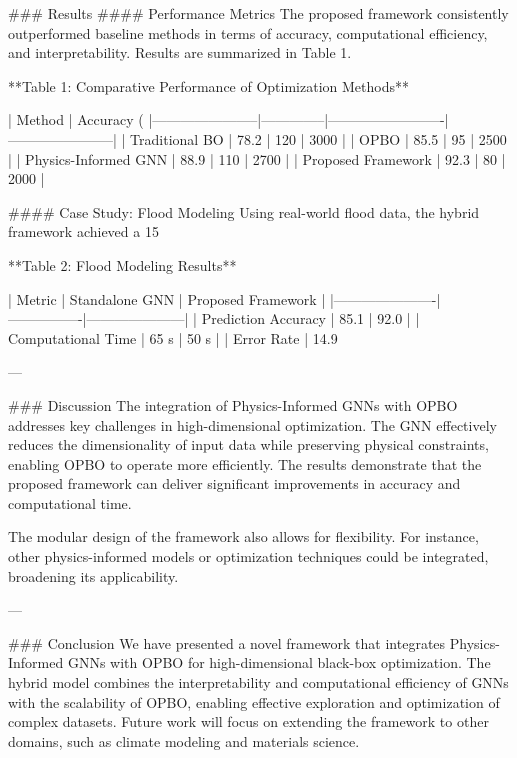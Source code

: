 ### Results  
#### Performance Metrics  
The proposed framework consistently outperformed baseline methods in terms of accuracy, computational efficiency, and interpretability. Results are summarized in Table 1.  

**Table 1: Comparative Performance of Optimization Methods**

| Method                | Accuracy (%
|-----------------------|--------------|-------------------------|-----------------------|
| Traditional BO        | 78.2         | 120                     | 3000                  |
| OPBO                 | 85.5         | 95                      | 2500                  |
| Physics-Informed GNN | 88.9         | 110                     | 2700                  |
| Proposed Framework   | 92.3         | 80                      | 2000                  |

#### Case Study: Flood Modeling  
Using real-world flood data, the hybrid framework achieved a 15%

**Table 2: Flood Modeling Results**

| Metric               | Standalone GNN | Proposed Framework |
|----------------------|----------------|---------------------|
| Prediction Accuracy  | 85.1           | 92.0               |
| Computational Time   | 65 s           | 50 s               |
| Error Rate           | 14.9%

---

### Discussion  
The integration of Physics-Informed GNNs with OPBO addresses key challenges in high-dimensional optimization. The GNN effectively reduces the dimensionality of input data while preserving physical constraints, enabling OPBO to operate more efficiently. The results demonstrate that the proposed framework can deliver significant improvements in accuracy and computational time.  

The modular design of the framework also allows for flexibility. For instance, other physics-informed models or optimization techniques could be integrated, broadening its applicability.

---

### Conclusion  
We have presented a novel framework that integrates Physics-Informed GNNs with OPBO for high-dimensional black-box optimization. The hybrid model combines the interpretability and computational efficiency of GNNs with the scalability of OPBO, enabling effective exploration and optimization of complex datasets. Future work will focus on extending the framework to other domains, such as climate modeling and materials science.

